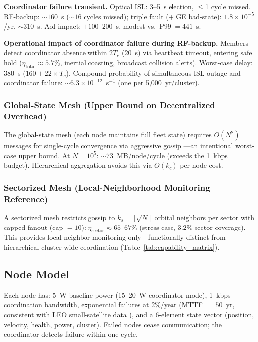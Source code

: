 \documentclass[journal]{IEEEtran}
\begin{document}
\textbf{Coordinator failure transient.}
\label{sec:coord_failure_transient}
Optical ISL: 3--5~s election, $\leq$1 cycle missed. RF-backup: ${\sim}160$~s (${\sim}16$ cycles missed); triple fault (+ GE bad-state): $1.8 \times 10^{-5}$/yr, ${\sim}310$~s. AoI impact: $+100$--$200$~s, modest vs.\ P99 $= 441$~s.

\textbf{Operational impact of coordinator failure during RF-backup.} Members detect coordinator absence within $2T_c$ (20~s) via heartbeat timeout, entering safe hold ($\eta_{\text{total}} \approx 5.7\%$, inertial coasting, broadcast collision alerts). Worst-case delay: 380~s ($160 + 22 \times T_c$). Compound probability of simultaneous ISL outage and coordinator failure: ${\sim}6.3 \times 10^{-12}$~s$^{-1}$ (one per 5{,}000~yr/cluster).

\subsubsection{Global-State Mesh (Upper Bound on Decentralized Overhead)}

The global-state mesh (each node maintains full fleet state) requires $O(N^2)$ messages for single-cycle convergence via aggressive gossip \cite{demers_gossip}---an intentional worst-case upper bound. At $N = 10^5$: ${\sim}73$~MB/node/cycle (exceeds the 1~kbps budget). Hierarchical aggregation avoids this via $O(k_c)$ per-node cost.

\subsubsection{Sectorized Mesh (Local-Neighborhood Monitoring Reference)}
\label{sec:sectorized_mesh_model}

A sectorized mesh restricts gossip to $k_s = \lceil\sqrt{N}\rceil$ orbital neighbors per sector with capped fanout (cap $= 10$): $\eta_{\text{sector}} \approx 65$--$67\%$ (stress-case, 3.2\% sector coverage). This provides local-neighbor monitoring only---functionally distinct from hierarchical cluster-wide coordination (Table~\ref{tab:capability_matrix}).


\subsection{Node Model}

Each node has: 5~W baseline power (15--20~W coordinator mode), 1~kbps coordination bandwidth, exponential failures at 2\%/year (MTTF~$= 50$~yr, consistent with LEO small-satellite data \cite{castet_smallsat_reliability}), and a 6-element state vector (position, velocity, health, power, cluster). Failed nodes cease communication; the coordinator detects failure within one cycle.
\end{document}
